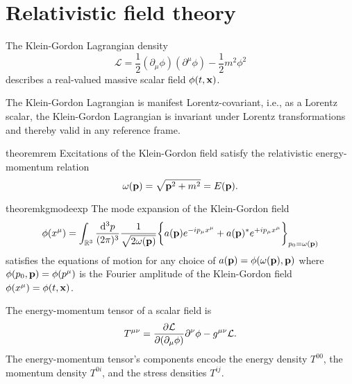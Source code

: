 \section{Relativistic field theory}

\begin{definition}
	The Klein-Gordon Lagrangian density
	\begin{equation}
		\mathcal{L}
		=
		\frac{1}{2}
		\left(\partial_\mu\phi\right)
		\left(\partial^\mu\phi\right)
		-
		\frac{1}{2}
		m^2\phi^2
		\label{eq:kg_lagrangian}
	\end{equation}
	describes a real-valued massive scalar field $\phi(t,\vb{x})$.
\end{definition}
The Klein-Gordon Lagrangian is manifest Lorentz-covariant, i.e., as a Lorentz scalar, the Klein-Gordon Lagrangian is invariant under Lorentz transformations and thereby valid in any reference frame.
\begin{restatable}{theorem}{rem}\label{th:relativistic_energy_momentum}
	Excitations of the Klein-Gordon field satisfy the relativistic energy-momentum relation
	\begin{equation}
		\omega(\vb{p})
		=
		\sqrt{\vb{p}^2+m^2}
		=
		E(\vb{p})
		\label{eq:energy_momentum_relation}
		.
	\end{equation}
\end{restatable}
\begin{restatable}{theorem}{kgmodeexp}\label{thm:kg_mode_expansion}
	The mode expansion of the Klein-Gordon field
	\begin{equation}
		\phi(x^\mu)
		=
		\int_{\mathbb{R}^3}\frac{\dd[3]{p}}{(2\pi)^3}
		\frac{1}{\sqrt{2\omega(\vb{p})}}
		\biggl\{
			a(\vb{p})
			e^{-ip_\mu x^\mu}
			+
			a(\vb{p})^*
			e^{+ip_\mu x^\mu}
		\biggr\}_{p_0=\omega(\vb{p})}
		\label{eq:kg_mode_expansion}
	\end{equation}
	satisfies the equations of motion for any choice of $a(\vb{p})=\phi(\omega(\vb{p}),\vb{p})$ where $\phi(p_0,\vb{p})=\phi(p^\mu)$ is the Fourier amplitude of the Klein-Gordon field $\phi(x^\mu)=\phi(t,\vb{x})$.
\end{restatable}
\begin{definition}
	The energy-momentum tensor of a scalar field is
	\begin{equation}
		T^{\mu\nu}
		=
		\pdv{\mathcal{L}}{(\partial_\mu\phi)}\partial^\nu\phi
		-
		g^{\mu\nu}\mathcal{L}
		\label{eq:energy_momentum_tensor}
		.
	\end{equation}
	The energy-momentum tensor's components encode the energy density $T^{00}$, the momentum density $T^{0i}$, and the stress densities $T^{ij}$.
\end{definition}
